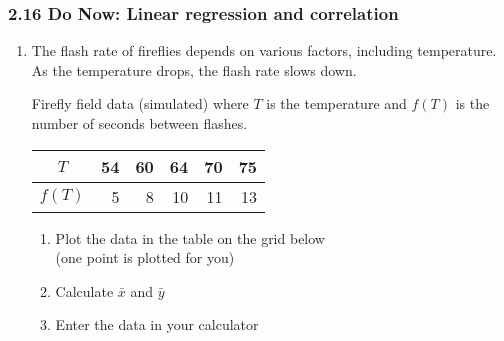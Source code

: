 \documentclass[12pt, twoside]{article}
\begin{document}
\subsubsection*{2.16 Do Now: Linear regression and correlation}
\begin{enumerate}
 
  \item The flash rate of fireflies depends on various factors, including temperature. As the temperature drops, the flash rate slows down.
  
  
  
  
  
  Firefly field data (simulated) where $T$ is the temperature and $f(T)$ is the number of seconds between flashes. \\[10pt]
  \begin{tabular}{|c|r|r|r|r|r|}
  \hline
  $T$ & 54 & 60 & 64 & 70 & 75 \\ [3pt]
  \hline
  $f(T)$ & 5 & 8 & 10 & 11 & 13  \\  [3pt]
  \hline
  \end{tabular}
  \begin{enumerate}
      \item Plot the data in the table on the grid below \\
      (one point is plotted for you)
      \item Calculate $\bar{x}$ and $\bar{y}$
      \item Enter the data in your calculator
  \end{enumerate}
  
  \vspace{1in}
  

\end{enumerate}
\end{document}
